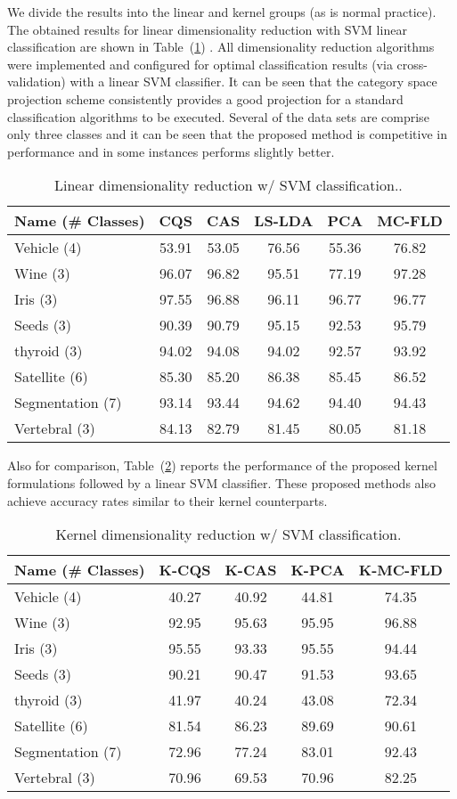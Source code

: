 We divide the results into the linear and kernel groups (as is normal
practice). The obtained results for linear dimensionality reduction
with SVM linear classification are shown in Table~(\ref{tab:List-of-test-results})
. All dimensionality reduction algorithms were implemented and configured
for optimal classification results (via cross-validation) with a linear
SVM classifier. It can be seen that the category space projection
scheme consistently provides a good projection for a standard classification
algorithms to be executed. Several of the data sets are comprise only
three classes and it can be seen that the proposed method is competitive
in performance and in some instances performs slightly better. 

\begin{table}[H]
\medskip{}

\caption{Linear dimensionality reduction w/ SVM classification..\label{tab:List-of-test-results}}

\centering{}%
\begin{tabular}{lccccc}
\hline 
\textbf{Name (\# Classes)} & \textbf{CQS} & \textbf{CAS} & \textbf{LS-LDA} & \textbf{PCA} & \textbf{MC-FLD}\tabularnewline
\hline 
Vehicle (4) & 53.91 & 53.05 & 76.56 & 55.36 & 76.82\tabularnewline
Wine (3) & 96.07 & 96.82 & 95.51 & 77.19 & 97.28\tabularnewline
Iris (3) & 97.55 & 96.88 & 96.11 & 96.77 & 96.77\tabularnewline
Seeds (3) & 90.39 & 90.79 & 95.15 & 92.53 & 95.79\tabularnewline
thyroid (3) & 94.02 & 94.08 & 94.02 & 92.57 & 93.92\tabularnewline
Satellite (6) & 85.30 & 85.20 & 86.38 & 85.45 & 86.52\tabularnewline
Segmentation (7) & 93.14 & 93.44 & 94.62 & 94.40 & 94.43\tabularnewline
Vertebral (3) & 84.13 & 82.79 & 81.45 & 80.05 & 81.18\tabularnewline
\hline 
\end{tabular}
\end{table}

Also for comparison, Table~(\ref{tab:List-of-test-results-kernel-norm})
reports the performance of the proposed kernel formulations followed
by a linear SVM classifier. These proposed methods also achieve accuracy
rates similar to their kernel counterparts. 

\begin{table}[H]
\medskip{}

\caption{Kernel dimensionality reduction w/ SVM classification. \label{tab:List-of-test-results-kernel-norm}}

\centering{}%
\begin{tabular}{lcccc}
\hline 
\textbf{Name (\# Classes)} & \textbf{K-CQS} & \textbf{K-CAS} & \textbf{K-PCA} & \textbf{K-MC-FLD}\tabularnewline
\hline 
Vehicle (4) & 40.27 & 40.92 & 44.81 & 74.35\tabularnewline
Wine (3) & 92.95 & 95.63 & 95.95 & 96.88\tabularnewline
Iris (3) & 95.55 & 93.33 & 95.55 & 94.44\tabularnewline
Seeds (3) & 90.21 & 90.47 & 91.53 & 93.65\tabularnewline
thyroid (3) & 41.97 & 40.24 & 43.08 & 72.34\tabularnewline
Satellite (6) & 81.54 & 86.23 & 89.69 & 90.61\tabularnewline
Segmentation (7) & 72.96 & 77.24 & 83.01 & 92.43\tabularnewline
Vertebral (3) & 70.96 & 69.53 & 70.96 & 82.25\tabularnewline
\hline 
\end{tabular}
\end{table}

